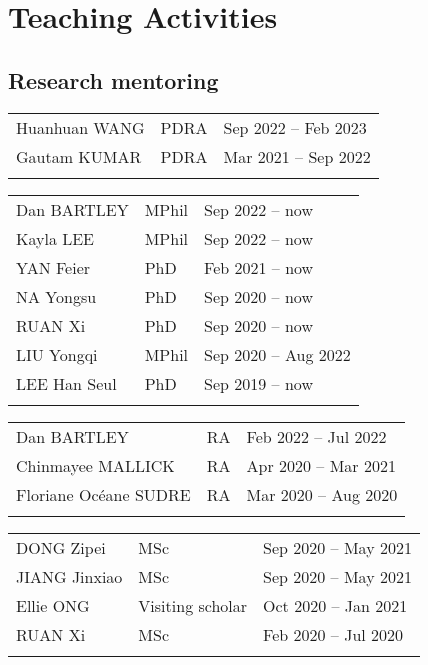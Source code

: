 \documentclass[letterpaper]{article}
\begin{document}

\section*{Teaching Activities}

\subsection*{Research mentoring}

\begin{tabularx}{\textwidth}{XXX}
  Huanhuan WANG           & PDRA  & Sep 2022 -- Feb 2023\\
  Gautam KUMAR            & PDRA  & Mar 2021 -- Sep 2022\\
  \\
\end{tabularx}

\begin{tabularx}{\textwidth}{XXX}
  Dan BARTLEY             & MPhil & Sep 2022 -- now\\
  Kayla LEE               & MPhil & Sep 2022 -- now\\
  YAN Feier               & PhD   & Feb 2021 -- now\\
  NA Yongsu               & PhD   & Sep 2020 -- now\\
  RUAN Xi                 & PhD   & Sep 2020 -- now\\
  LIU Yongqi              & MPhil & Sep 2020 -- Aug 2022\\
  LEE Han Seul            & PhD   & Sep 2019 -- now\\
  \\
\end{tabularx}

\begin{tabularx}{\textwidth}{XXX}
  Dan BARTLEY             & RA    & Feb 2022 -- Jul 2022\\
  Chinmayee MALLICK       & RA    & Apr 2020 -- Mar 2021\\
  Floriane Oc\'eane SUDRE & RA    & Mar 2020 -- Aug 2020\\
  \\
\end{tabularx}

\begin{tabularx}{\textwidth}{XXX}
  DONG Zipei        & MSc               & Sep 2020 -- May 2021\\
  JIANG Jinxiao     & MSc               & Sep 2020 -- May 2021\\
  Ellie ONG         & Visiting scholar  & Oct 2020 -- Jan 2021\\
  RUAN Xi           & MSc               & Feb 2020 -- Jul 2020\\
  \\
\end{tabularx}
  
\end{document}
